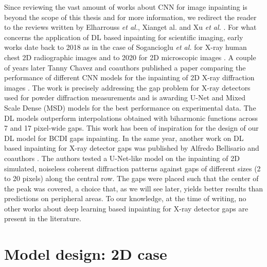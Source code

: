 Since reviewing the vast amount of works about CNN for image inpainting is beyond the scope of this thesis and for more 
information, we redirect the reader to the reviews written by Elharrouss \textit{et al.}, Xiang{et al.} and  Xu 
\textit{et al.} \cite{reviewInpainting2021,DL_InpaintingReveiw2023_0, reviewInpaintingDL2023}. For what concerns the application of DL based 
inpainting for scientific imaging, early works date back to 2018 as in the case of Sogancioglu \textit{et al.} for X-ray 
human chest 2D radiographic images \cite{sogancioglu2018chestxrayinpaintingdeep} and to 2020 for 2D microscopic images \cite{microscopic_inpainting_2020}.
A couple of years later Tanny Chavez and coauthors published a paper comparing the performance of different CNN models 
for the inpainting of 2D X-ray diffraction images \cite{chavez_comparison_2022}. The work is precisely addressing the 
gap problem for X-ray detectors used for powder diffraction measurements and is awarding U-Net and Mixed Scale Dense (MSD) 
models for the best performance on experimental data. The DL models outperform interpolations obtained with biharmonic functions
across 7 and 17 pixel-wide gaps. This work has been of inspiration for the design of our DL model for BCDI gaps inpainting.
In the same year, another work on DL based inpainting for X-ray detector gaps was published by Alfredo Bellisario 
and coauthors \cite{bellisario_noise_2022}. The authors tested a U-Net-like model on the inpainting of 2D simulated, noiseless
coherent diffraction patterns against gaps of different sizes (2 to 20 pixels) along the central row. The gaps were 
placed such that the center of the peak was covered, a choice that, as we will see later, yields better results than 
predictions on peripheral areas. To our knowledge, at the time of writing, no other works about deep learning based inpainting
for X-ray detector gaps are present in the literature. \\


\section{Model design: 2D case}\label{sec:model}


